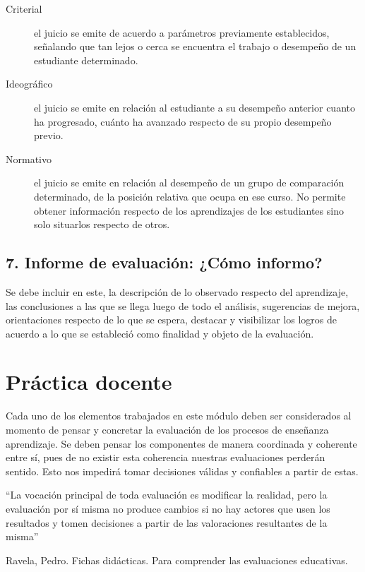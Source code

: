 \documentclass[12pt,letterpaper,article,x11names]{memoir}
\begin{document}
\begin{description}
\item[{Criterial}] el juicio se emite de acuerdo a parámetros previamente establecidos, señalando que tan lejos o cerca se encuentra el trabajo o desempeño de un estudiante determinado.

\item[{Ideográfico}] el juicio se emite en relación al estudiante a su desempeño anterior cuanto ha progresado, cuánto ha avanzado respecto de su propio desempeño previo.

\item[{Normativo}] el juicio se emite en relación al desempeño de un grupo de comparación determinado, de la posición relativa que ocupa en ese curso. No permite obtener información respecto de los aprendizajes de los estudiantes sino solo situarlos respecto de otros.
\end{description}

\subsection{7. Informe de evaluación: ¿Cómo informo?}
\label{sec:orgcb71e16}
Se debe incluir en este, la descripción de lo observado respecto del aprendizaje, las conclusiones a las que se llega luego de todo el análisis, sugerencias de mejora, orientaciones respecto de lo que se espera, destacar y visibilizar los logros de acuerdo a lo que se estableció como finalidad y objeto de la evaluación.

\section{Práctica docente}
\label{sec:org02eef9f}
Cada uno de los elementos trabajados en este módulo deben ser considerados al momento de pensar y concretar la evaluación de los procesos de enseñanza aprendizaje. Se deben pensar los componentes de manera coordinada y coherente entre sí, pues de no existir esta coherencia nuestras evaluaciones perderán sentido. Esto nos impedirá tomar decisiones válidas y confiables a partir de estas. 

“La vocación principal de toda evaluación es modificar la realidad, pero la evaluación por sí misma no produce cambios si no hay actores que usen los resultados y tomen decisiones a partir de las valoraciones resultantes de la misma”


Ravela, Pedro. Fichas didácticas. Para comprender las evaluaciones educativas.
\end{document}

